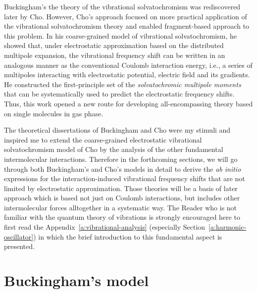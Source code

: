 \documentclass[a4paper,titlepage,twoside,fleqn,12pt]{book}
\begin{document}
\begin{refsection}
Buckingham's the theory of the vibrational solvatochromism was rediscovered later 
by Cho.\citep{Cho.JCP.2003,Cho.JCP.2009} 
However, Cho's 
approach focused on more practical application of the vibrational solvatochromism 
theory and enabled fragment\hyp{}based approach to this problem. In his coarse\hyp{}grained
model of vibrational solvatochromism, he showed that,
under electrostatic approximation based on the distributed multipole expansion, 
the vibrational frequency shift can be written in an analogous manner as the conventional
Coulomb interaction energy, i.e., a series of multipoles interacting with
electrostatic potential, electric field and its gradients. 
He constructed the first\hyp{}principle set of 
the \emph{solvatochromic multipole moments} that can be systematically used
to predict the electrostatic frequency shifts. Thus, this work opened a new route for developing
all\hyp{}encompassing theory based on single molecules in gas phase.

The theoretical dissertations of Buckingham and Cho were my stimuli and inspired
me to extend the coarse\hyp{}grained electrostatic vibrational solvatochromism 
model of Cho by the analysis of the other fundamental intermolecular interactions.
Therefore in the forthcoming sections, we will go through both Buckingham's and Cho's
models in detail
to derive the \emph{ab initio} expressions for the interaction\hyp{}induced 
vibrational frequency shifts that are not limited by electrostatic approximation.
Those theories will be a basis of later approach which is based not just on
Coulomb interactions, but includes other intermolecular forces alltogether
in a systematic way.
The Reader who is not familiar with the quantum theory of vibrations is strongly encouraged
here to first read the Appendix~\ref{a:vibrational-analysis} (especially Section~\ref{a:harmonic-oscillator})
in which the brief introduction to this fundamental aspect is presented.

\section{Buckingham's model  \label{s:buckingham-theory}}


\end{refsection}
\end{document}
